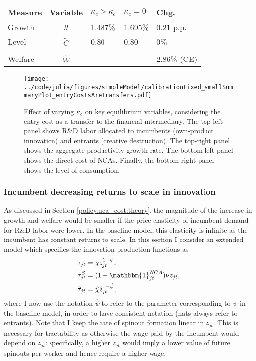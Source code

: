 \documentclass[11pt,english]{article}
\theoremstyle{definition}
\begin{document}
\begin{table}
	\centering
	\label{reducing_kappa_c_table_entryCostsAsTransfers}
	\begin{tabular}{lclll}
		\toprule \toprule
		Measure & Variable & $\kappa_c > \bar{\kappa}_c$ & $\kappa_c = 0$ & Chg. \tabularnewline
		\midrule
		Growth & $g$ & 1.487\% & 1.695\% & 0.21 p.p. \tabularnewline
		Level & $\tilde{C}$  & 0.80 &  0.80 & 0\% \tabularnewline 
		\tabularnewline
		Welfare & $\tilde{W}$  &  & & 2.86\% (CE)  \tabularnewline
		\bottomrule
	\end{tabular}
\end{table}


\begin{figure}[]
	\centering
	\texttt{[image: ../code/julia/figures/simpleModel/calibrationFixed\_smallSummaryPlot\_entryCostsAreTransfers.pdf]}
	\caption{Effect of varying $\kappa_c$ on key equilibrium variables, considering the entry cost as a transfer to the financial intermediary. The top-left panel shows R\&D labor allocated to incumbents (own-product innovation) and entrants (creative destruction). The top-right panel shows the aggregate productivity growth rate. The bottom-left panel shows the direct cost of NCAs. Finally, the bottom-right panel shows the level of consumption.}
	\label{calibration_smallSummaryPlot_entryCostsAsTransfers}
\end{figure}

\subsubsection{Incumbent decreasing returns to scale in innovation}

As discussed in Section \ref{policy:nca_cost:theory}, the magnitude of the increase in growth and welfare would be smaller if the price-elasticity of incumbent demand for R\&D labor were lower. In the baseline model, this elasticity is infinite as the incumbent has constant returns to scale. In this section I consider an extended model which specifies the innovation production functions as 
\begin{align}
	\tau_{jt} &= \chi z_{jt}^{1-\psi}, \\
	\tau^S_{jt} &= (1 - \mathbbm{1}^{NCA}_{jt}) \nu z_{jt}, \\
	\hat{\tau}_{jt} &= \hat{\chi} \hat{z}_{jt}^{1-\hat{\psi}},
\end{align}
where I now use the notation $\hat{\psi}$ to refer to the parameter corresponding to $\psi$ in the baseline model, in order to have consistent notation (hats always refer to entrants). Note that I keep the rate of spinout formation linear in $z_{jt}$. This is necessary for tractability as otherwise the wage paid by the incumbent would depend on $z_{jt}$: specifically, a higher $z_{jt}$ would imply a lower value of future spinouts per worker and hence require a higher wage. 
\end{document}
